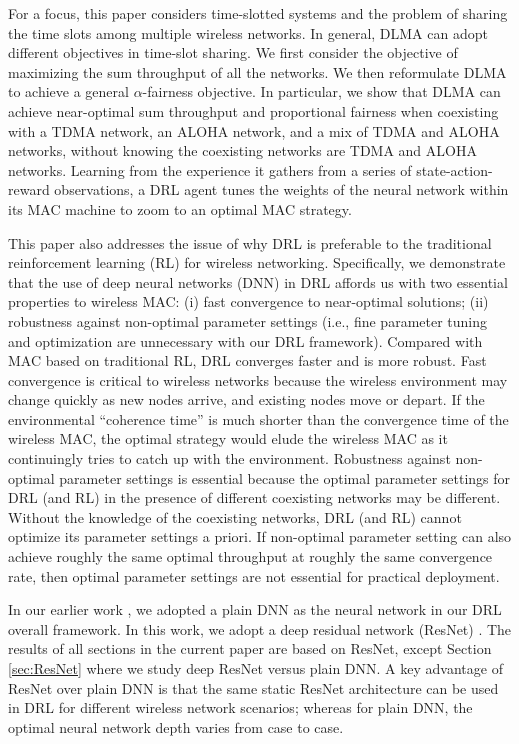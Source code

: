 \documentclass[journal,comsoc]{IEEEtran}
\begin{document}
For a focus, this paper considers time-slotted systems and the problem of sharing the time slots among multiple wireless networks. In general, DLMA can adopt different objectives in time-slot sharing. We first consider the objective of maximizing the sum throughput of all the networks. We then reformulate DLMA to achieve a general  $ \alpha $-fairness objective. In particular, we show that DLMA can achieve near-optimal sum throughput and proportional fairness when coexisting with a TDMA network, an ALOHA network, and a mix of TDMA and ALOHA networks, without knowing the coexisting networks are TDMA and ALOHA networks. Learning from the experience it gathers from a series of state-action-reward observations, a DRL agent tunes the weights of the neural network within its MAC machine to zoom to an optimal MAC strategy.

This paper also addresses the issue of why DRL is preferable to the traditional reinforcement learning (RL) \cite{sutton1998reinforcement} for wireless networking. Specifically, we demonstrate that the use of deep neural networks (DNN) in DRL affords us with two essential properties to wireless MAC: (i) fast convergence to near-optimal solutions; (ii) robustness against non-optimal parameter settings (i.e., fine parameter tuning and optimization are unnecessary with our DRL framework). Compared with MAC based on traditional RL, DRL converges faster and is more robust. Fast convergence is critical to wireless networks because the wireless environment may change quickly as new nodes arrive, and existing nodes move or depart. If the environmental ``coherence time'' is much shorter than the convergence time of the wireless MAC, the optimal strategy would elude the wireless MAC as it continuingly tries to catch up with the environment. Robustness against non-optimal parameter settings is essential because the optimal parameter settings for DRL (and RL) in the presence of different coexisting networks may be different. Without the knowledge of the coexisting networks, DRL (and RL) cannot optimize its parameter settings a priori. If non-optimal parameter setting can also achieve roughly the same optimal throughput at roughly the same convergence rate, then optimal parameter settings are not essential for practical deployment.

In our earlier work \cite{yu2018deep}, we adopted a plain DNN as the neural network in our DRL overall framework. In this work, we adopt a deep residual network (ResNet) \cite{he2016deep}. The results of all sections in the current paper are based on ResNet, except Section \ref{sec:ResNet} where we study deep ResNet versus plain DNN.  A key advantage of ResNet over plain DNN is that the same static ResNet architecture can be used in DRL for different wireless  network scenarios; whereas for plain DNN, the optimal neural network depth varies from case to case.
\end{document}
